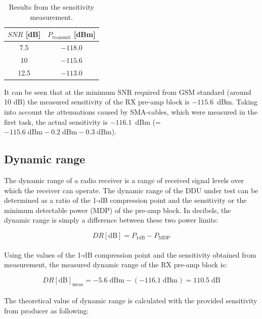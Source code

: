 \documentclass[a4paper, 12pt]{article}
\begin{document}
\begin{table}[!h]
	\begin{center}
	\caption{Results from the sensitivity measurement.}
	\label{t:sens}
	\renewcommand*{\arraystretch}{1.2}
	\begin{tabular}{cc}
	$\mathit{SNR}$ [dB] 			& $P_\mathrm{transmit}$ [dBm]  \\
	\hline
	7.5								& $-118.0$ 	\\
	10								& $-115.6$ 	\\
	12.5							& $-113.0$ 	
	\end{tabular}
	\end{center}
	\vspace*{-12pt}
\end{table}

It can be seen that at the minimum SNR required from GSM standard (around 10 dB) the measured sensitivity of the RX pre-amp block is $-115.6$~dBm. Taking into account the attenuations caused by SMA-cables, which were measured in the first task, the actual sensitivity is $-116.1$~dBm (=$-115.6\mathrm{\;dBm} - 0.2\mathrm{\;dBm} - 0.3\mathrm{\;dBm}$).

\subsection{Dynamic range}

The dynamic range of a radio receiver is a range of received signal levels over which the receiver can operate. The dynamic range of the DDU under test can be determined as a ratio of the 1-dB compression point and the sensitivity or the minimum detectable power (MDP) of the pre-amp block. In decibels, the dynamic range is simply a difference between these two power limits:

\begin{equation}
DR[\mathrm{dB}] = P_\mathrm{1dB} - P_\mathrm{MDP} 
\end{equation}
\\

Using the values of the 1-dB compression point and the sensitivity obtained from measurement, the measured dynamic range of the RX pre-amp block is:

\begin{equation}
DR[\mathrm{dB}]_\mathrm{meas} = -5.6 \mathrm{\;dBm} - (-116.1 \mathrm{\;dBm}) = 110.5 \mathrm{\;dB}
\end{equation}
\\

The theoretical value of dynamic range is calculated with the provided sensitivity from producer as following:
\end{document}
